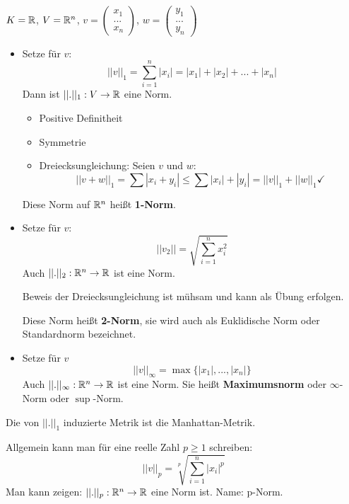\documentclass[main.tex]{subfiles}
\begin{document}
\begin{Beispiel}
  $K = \mathbb{R}$, $V = \mathbb{R}^n$, $v = \left(\begin{array}{c}x_1\\...\\x_n \end{array}\right)$, $w = \left(\begin{array}{c}y_1\\...\\y_n \end{array}\right)$
  \begin{itemize}
    \item Setze für $v$:
      $$||v||_1 = \sum \limits_{i=1}^n |x_i| = |x_1| + |x_2| + ... + |x_n|$$
      Dann ist $||.||_1 : V \to \mathbb{R}$ eine Norm.
      \begin{Beweis}
        \begin{itemize}
          \item Positive Definitheit \checkmark
          \item Symmetrie \checkmark
          \item Dreiecksungleichung:
            Seien $v$ und $w$:
            $$||v+w||_1 = \sum |x_i + y_i| \leq \sum|x_i|+|y_i| = ||v||_1 + ||w||_1 \checkmark$$
        \end{itemize}
      \end{Beweis}
      Diese Norm auf $\mathbb{R}^n$ heißt \textbf{1-Norm}.

    \item Setze für $v$:
      $$||v_2|| = \sqrt{\sum \limits_{i=1}^n x_i^2}$$
      Auch $||.||_2 : \mathbb{R}^n \to \mathbb{R}$ ist eine Norm.
      \begin{Beweis}
        Beweis der Dreiecksungleichung ist mühsam und kann als Übung erfolgen.
      \end{Beweis}
      Diese Norm heißt \textbf{2-Norm}, sie wird auch als Euklidische Norm oder Standardnorm bezeichnet.

    \item Setze für $v$
      $$||v||_\infty = \max \{|x_1|,...,|x_n|\}$$
      Auch $||.||_\infty : \mathbb{R}^n \to \mathbb{R}$ ist eine Norm. Sie heißt \textbf{Maximumsnorm} oder $\infty$-Norm oder $\sup$-Norm.
  \end{itemize}
  \begin{Bemerkung}
    Die von $||.||_1$ induzierte Metrik ist die Manhattan-Metrik.
  \end{Bemerkung}

  \begin{Theorem}
    Allgemein kann man für eine reelle Zahl $p \geq 1$ schreiben:
    $$||v||_p = \sqrt[p]{\sum \limits_{i=1}^n |x_i|^p}$$
    Man kann zeigen: $||.||_p : \mathbb{R}^n \to \mathbb{R}$ eine Norm ist. Name: p-Norm.
  \end{Theorem}
\end{Beispiel}
\end{document}
